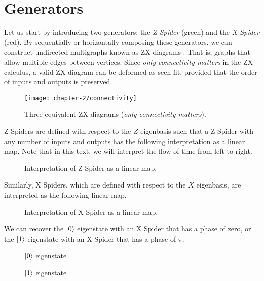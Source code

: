 \section{Generators}

Let us start by introducing two generators: the \textit{Z Spider} (green) and the \textit{X Spider} (red). By sequentially or horizontally composing these generators, we can construct undirected multigraphs known as ZX diagrams \cite{Wetering2020}. That is, graphs that allow multiple edges between vertices. Since \textit{only connectivity matters} in the ZX calculus, a valid ZX diagram can be deformed as seen fit, provided that the order of inputs and outputs is preserved.
\begin{figure}[H]
\centering
    \centering
    \texttt{[image: chapter-2/connectivity]}
    \caption{Three equivalent ZX diagrams (\textit{only connectivity matters}).}
\end{figure}

Z Spiders are defined with respect to the $Z$ eigenbasis such that a Z Spider with any number of inputs and outputs has the following interpretation as a linear map. Note that in this text, we will interpret the flow of time from left to right.
\begin{figure}[H]
\centering
{}
\caption{Interpretation of Z Spider as a linear map.}
\end{figure}
Similarly, X Spiders, which are defined with respect to the $X$ eigenbasis, are interpreted as the following linear map.
\begin{figure}[H]
\centering
{}
\caption{Interpretation of X Spider as a linear map.}
\end{figure}

We can recover the $\ket 0$ eigenstate with an X Spider that has a phase of zero, or the $\ket 1$ eigenstate with an X Spider that has a phase of $\pi$.
\begin{figure}[H]
\centering
\begin{minipage}{.4\textwidth}
    \centering
    \caption{$\ket 0$ eigenstate}
\end{minipage}%
\begin{minipage}{.4\textwidth}
    \centering
    \caption{$\ket 1$ eigenstate}
\end{minipage}
\end{figure}

